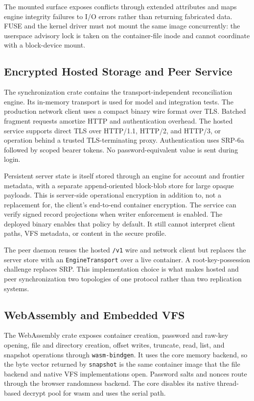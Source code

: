 The mounted surface exposes conflicts through extended attributes and maps
engine integrity failures to I/O errors rather than returning fabricated data.
FUSE and the kernel driver must not mount the same image concurrently: the
userspace advisory lock is taken on the container-file inode and cannot
coordinate with a block-device mount.

\subsection{Encrypted Hosted Storage and Peer Service}

The synchronization crate contains the transport-independent reconciliation
engine.  Its in-memory transport is used for model and integration tests.  The
production network client uses a compact binary wire format over TLS.  Batched
fragment requests amortize HTTP and authentication overhead.  The hosted
service supports direct TLS over HTTP/1.1, HTTP/2, and HTTP/3, or operation
behind a trusted TLS-terminating proxy.  Authentication uses SRP-6a followed by
scoped bearer tokens.  No password-equivalent value is sent during login.

Persistent server state is itself stored through an \sfs{} engine for account
and frontier metadata, with a separate append-oriented block-blob store for
large opaque payloads.  This is server-side operational encryption in addition
to, not a replacement for, the client's end-to-end container encryption.  The
service can verify signed record projections when writer enforcement is
enabled.  The deployed binary enables that policy by default.  It still cannot
interpret client paths, VFS metadata, or content in the secure profile.

The peer daemon reuses the hosted \texttt{/v1} wire and network client but
replaces the server store with an \texttt{EngineTransport} over a live
container.  A root-key-possession challenge replaces SRP.  This implementation
choice is what makes hosted and peer synchronization two topologies of one
protocol rather than two replication systems.

\subsection{WebAssembly and Embedded VFS}

The WebAssembly crate exposes container creation, password and raw-key opening,
file and directory creation, offset writes, truncate, read, list, and snapshot
operations through \texttt{wasm-bindgen}.  It uses the core memory backend, so
the byte vector returned by \texttt{snapshot} is the same container image that
the file backend and native VFS implementations open.  Password salts and
nonces route through the browser randomness backend.  The core disables its
native thread-based decrypt pool for wasm and uses the serial path.

